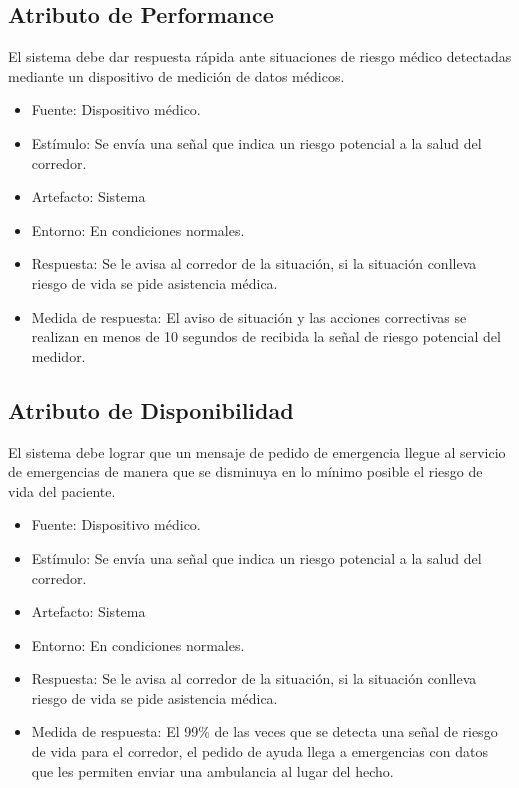 \subsection{Atributo de Performance}

El sistema debe dar respuesta rápida ante situaciones de riesgo médico
detectadas mediante un dispositivo de medición de datos médicos.

\begin{itemize}
\itemsep1pt\parskip0pt
\item
  Fuente: Dispositivo médico.
\item
  Estímulo: Se envía una señal que indica un riesgo potencial a la salud
  del corredor.
\item
  Artefacto: Sistema
\item
  Entorno: En condiciones normales.
\item
  Respuesta: Se le avisa al corredor de la situación, si la situación
  conlleva riesgo de vida se pide asistencia médica.
\item
  Medida de respuesta: El aviso de situación y las acciones correctivas
  se realizan en menos de 10 segundos de recibida la señal de riesgo
  potencial del medidor.
\end{itemize}

\subsection{Atributo de Disponibilidad}

El sistema debe lograr que un mensaje de pedido de emergencia llegue al
servicio de emergencias de manera que se disminuya en lo mínimo posible
el riesgo de vida del paciente.

\begin{itemize}
\itemsep1pt\parskip0pt
\item
  Fuente: Dispositivo médico.
\item
  Estímulo: Se envía una señal que indica un riesgo potencial a la salud
  del corredor.
\item
  Artefacto: Sistema
\item
  Entorno: En condiciones normales.
\item
  Respuesta: Se le avisa al corredor de la situación, si la situación
  conlleva riesgo de vida se pide asistencia médica.
\item
  Medida de respuesta: El 99\% de las veces que se detecta una señal de
  riesgo de vida para el corredor, el pedido de ayuda llega a
  emergencias con datos que les permiten enviar una ambulancia al lugar
  del hecho.
\end{itemize}


